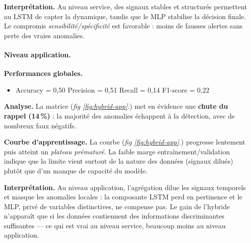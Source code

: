 \documentclass[conference]{IEEEtran}
\begin{document}
\textbf{Interprétation.}
Au niveau service, des signaux stables et structurés permettent au LSTM de capter la dynamique, tandis que le MLP stabilise la décision finale. Le compromis \textit{sensibilité/spécificité} est favorable : moins de fausses alertes sans perte des vraies anomalies.

\paragraph{Niveau application.}

\textbf{Performances globales.}
\begin{itemize}
    \item Accuracy = 0{,}50 \quad
          Precision = 0{,}51 \quad
          Recall = 0{,}14 \quad
          F1-score = 0{,}22
\end{itemize}

\textbf{Analyse.}
La matrice (\textit{fig \ref{fig:hybrid-app}.}) met en évidence une \textbf{chute du rappel (14\,\%)} : la majorité des anomalies échappent à la détection, avec de nombreux faux négatifs.

\textbf{Courbe d’apprentissage.}
La courbe (\textit{fig \ref{fig:hybrid-app}.}) progresse lentement puis atteint un \emph{plateau prématuré}. La faible marge entraînement/validation indique que la limite vient surtout de la nature des données (signaux dilués) plutôt que d’un manque de capacité du modèle.

\textbf{Interprétation.}
Au niveau application, l’agrégation dilue les signaux temporels et masque les anomalies locales : la composante LSTM perd en pertinence et le MLP, privé de variables distinctives, ne compense pas. Le gain de l’hybride n’apparaît que si les données contiennent des informations discriminantes suffisantes — ce qui est vrai au niveau service, beaucoup moins au niveau application.
\end{document}
